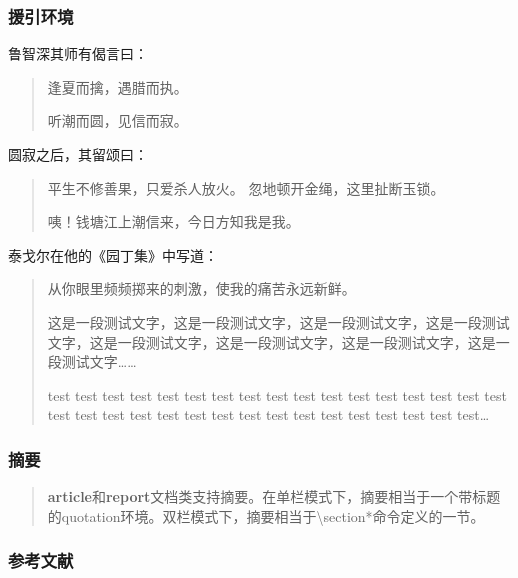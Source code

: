 \documentclass[twoside]{ctexart}
\begin{document}
        \subsubsection{援引环境}
            鲁智深其师有偈言曰：
            \begin{quote}
                逢夏而擒，遇腊而执。

                听潮而圆，见信而寂。
            \end{quote}

            圆寂之后，其留颂曰：
            \begin{quotation}
                平生不修善果，只爱杀人放火。
                忽地顿开金绳，这里扯断玉锁。

                咦！钱塘江上潮信来，今日方知我是我。
            \end{quotation}

            泰戈尔在他的《园丁集》中写道：
            \begin{verse}
                从你眼里频频掷来的刺激，使我的痛苦永远新鲜。

                这是一段测试文字，这是一段测试文字，这是一段测试文字，这是一段测试文字，这是一段测试文字，这是一段测试文字，这是一段测试文字，这是一段测试文字……

                test test test test test test test test test test test test test test test test test test test test test test test test test test test test test test test test test\ldots
            \end{verse}

        \subsubsection{摘要}
            \renewcommand{\abstractname}{这是摘要} %
            \begin{abstract}
                \textbf{article}和\textbf{report}文档类支持摘要。在单栏模式下，摘要相当于一个带标题的quotation环境。双栏模式下，摘要相当于\textbackslash section*命令定义的一节。
            \end{abstract}
        
        \subsubsection{参考文献}
\end{document}
